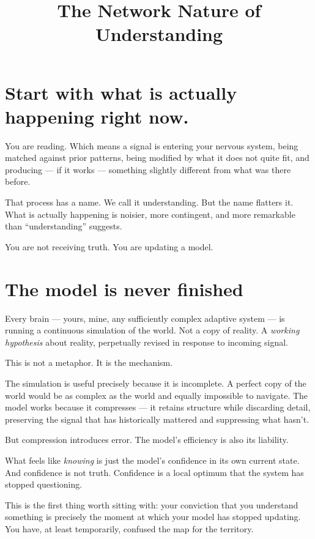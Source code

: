 \documentclass{article}
\title{The Network Nature of Understanding}
\author{}
\date{}
\begin{document}
\maketitle

\section*{Start with what is actually happening right now.}

You are reading. Which means a signal is entering your nervous system, being matched against prior patterns, being modified by what it does not quite fit, and producing --- if it works --- something slightly different from what was there before.

That process has a name. We call it understanding. But the name flatters it. What is actually happening is noisier, more contingent, and more remarkable than ``understanding'' suggests.

You are not receiving truth. You are updating a model.

\section*{The model is never finished}

Every brain --- yours, mine, any sufficiently complex adaptive system --- is running a continuous simulation of the world. Not a copy of reality. A \textit{working hypothesis} about reality, perpetually revised in response to incoming signal.

This is not a metaphor. It is the mechanism.

The simulation is useful precisely because it is incomplete. A perfect copy of the world would be as complex as the world and equally impossible to navigate. The model works because it compresses --- it retains structure while discarding detail, preserving the signal that has historically mattered and suppressing what hasn't.

But compression introduces error. The model's efficiency is also its liability.

What feels like \textit{knowing} is just the model's confidence in its own current state. And confidence is not truth. Confidence is a local optimum that the system has stopped questioning.

This is the first thing worth sitting with: your conviction that you understand something is precisely the moment at which your model has stopped updating. You have, at least temporarily, confused the map for the territory.
\end{document}
